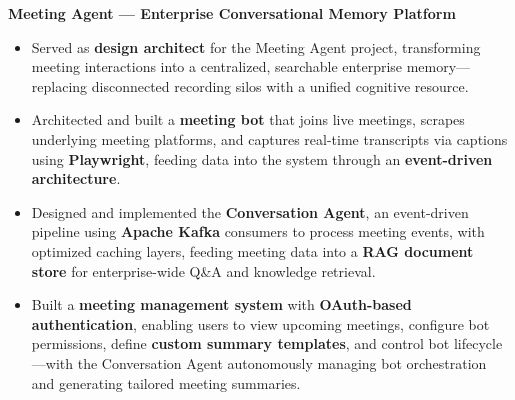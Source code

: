 \documentclass[a4paper,11pt]{article}
\begin{document}
\vspace{4pt}
\textbf{Meeting Agent --- Enterprise Conversational Memory Platform}
\begin{itemize}[leftmargin=*, nosep]
  \item Served as \textbf{design architect} for the Meeting Agent project, transforming meeting interactions into a centralized, searchable enterprise memory---replacing disconnected recording silos with a unified cognitive resource.
  \item Architected and built a \textbf{meeting bot} that joins live meetings, scrapes underlying meeting platforms, and captures real-time transcripts via captions using \textbf{Playwright}, feeding data into the system through an \textbf{event-driven architecture}.
  \item Designed and implemented the \textbf{Conversation Agent}, an event-driven pipeline using \textbf{Apache Kafka} consumers to process meeting events, with optimized caching layers, feeding meeting data into a \textbf{RAG document store} for enterprise-wide Q\&A and knowledge retrieval.
  \item Built a \textbf{meeting management system} with \textbf{OAuth-based authentication}, enabling users to view upcoming meetings, configure bot permissions, define \textbf{custom summary templates}, and control bot lifecycle---with the Conversation Agent autonomously managing bot orchestration and generating tailored meeting summaries.
\end{itemize}
\end{document}
